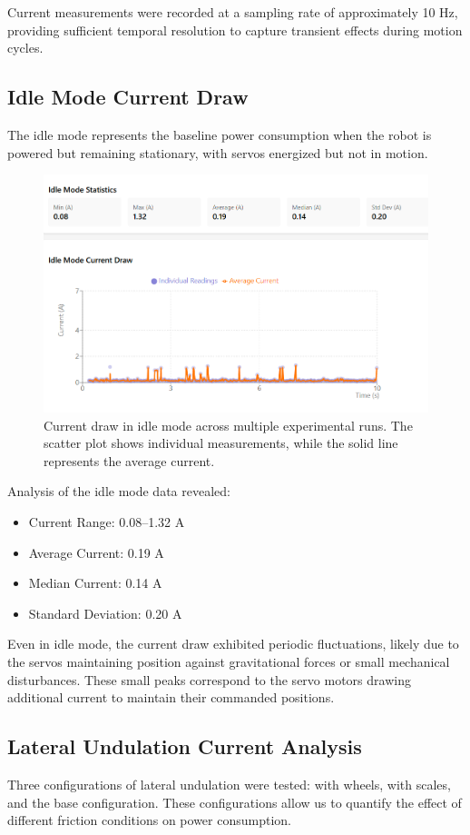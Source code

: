 \documentclass[12pt,a4paper]{report}
\begin{document}
Current measurements were recorded at a sampling rate of approximately 10 Hz, providing sufficient temporal resolution to capture transient effects during motion cycles.

\subsection{Idle Mode Current Draw}
The idle mode represents the baseline power consumption when the robot is powered but remaining stationary, with servos energized but not in motion.

\begin{figure}[H]
    \centering
    \includegraphics[width=12cm]{media/idle_mode_current.png}
    \caption{Current draw in idle mode across multiple experimental runs. The scatter plot shows individual measurements, while the solid line represents the average current.}
    \label{fig:idle_current}
\end{figure}

Analysis of the idle mode data revealed:
\begin{itemize}
    \item Current Range: 0.08--1.32 A
    \item Average Current: 0.19 A
    \item Median Current: 0.14 A
    \item Standard Deviation: 0.20 A
\end{itemize}

Even in idle mode, the current draw exhibited periodic fluctuations, likely due to the servos maintaining position against gravitational forces or small mechanical disturbances. These small peaks correspond to the servo motors drawing additional current to maintain their commanded positions.

\subsection{Lateral Undulation Current Analysis}
Three configurations of lateral undulation were tested: with wheels, with scales, and the base configuration. These configurations allow us to quantify the effect of different friction conditions on power consumption.
\end{document}
